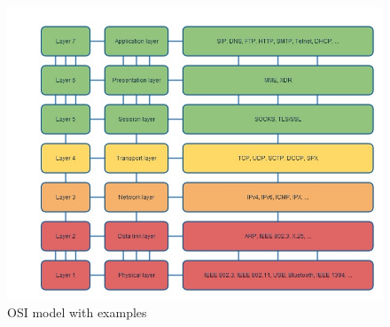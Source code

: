 \begin{figure}[H]
    \centering
    \includegraphics[width=\textwidth]{figures/osilayer}
    \caption{OSI model with examples} 
    \label{fig:OSImodel}
\end{figure}

\npar

